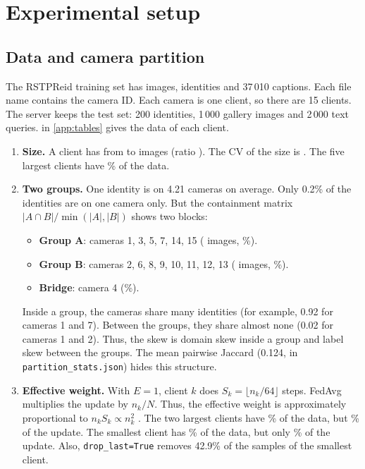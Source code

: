 \section{Experimental setup}\label{sec:setup}

\subsection{Data and camera partition}\label{sec:partition}
The RSTPReid training set has \numTotImg{} images, \numTotID{} identities and 37\,010 captions. Each file name contains the camera ID. Each camera is one client, so there are 15 clients. The server keeps the test set: 200 identities, 1\,000 gallery images and 2\,000 text queries.  in \cref{app:tables} gives the data of each client.


\begin{enumerate}[leftmargin=1.5em]
  \item \textbf{Size.} A client has from \numImgMin{} to \numImgMax{} images (ratio \numImgRatio). The CV of the size is \numCVSize. The five largest clients have \numFiveShareNom\% of the data.
  \item \textbf{Two groups.} One identity is on 4.21 cameras on average. Only 0.2\% of the identities are on one camera only. But the containment matrix $|A\cap B|/\min(|A|,|B|)$ shows two blocks:
  \begin{itemize}
    \item \textbf{Group A}: cameras 1, 3, 5, 7, 14, 15 (\numImgA{} images, \numShareA\%).
    \item \textbf{Group B}: cameras 2, 6, 8, 9, 10, 11, 12, 13 (\numImgB{} images, \numShareB\%).
    \item \textbf{Bridge}: camera 4 (\numShareC\%).
  \end{itemize}
  Inside a group, the cameras share many identities (for example, 0.92 for cameras 1 and 7). Between the groups, they share almost none (0.02 for cameras 1 and 2). Thus, the skew is domain skew inside a group and label skew between the groups. The mean pairwise Jaccard (0.124, in \texttt{partition\_stats.json}) hides this structure.
  \item \textbf{Effective weight.} With $E=1$, client $k$ does $S_k=\lfloor n_k/64\rfloor$ steps. FedAvg multiplies the update by $n_k/N$. Thus, the effective weight is approximately proportional to $n_kS_k\propto n_k^2$ \citep{wang2020tacklingobjectiveinconsistencyproblem}. The two largest clients have \numTwoShareNom\% of the data, but \numTwoShareEff\% of the update. The smallest client has \numNomTwo\% of the data, but only \numEffTwo\% of the update. Also, \texttt{drop\_last=True} removes 42.9\% of the samples of the smallest client.
\end{enumerate}

